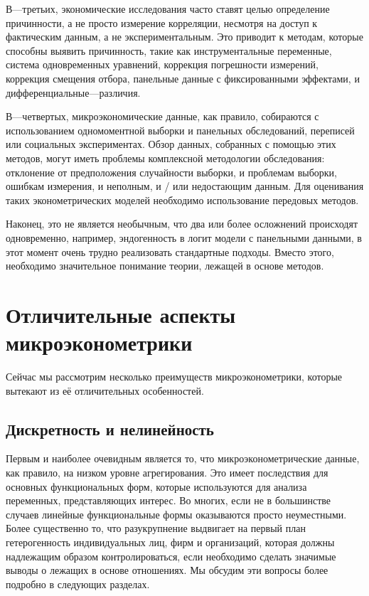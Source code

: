 	
	В---третьих, экономические исследования часто ставят целью определение причинности, а не просто измерение корреляции, несмотря на доступ к фактическим данным, а не экспериментальным. Это приводит к методам, которые способны выявить причинность, такие как инструментальные переменные, система одновременных уравнений, коррекция погрешности измерений, коррекция смещения отбора, панельные данные с фиксированными эффектами, и дифференциальные---различия.
	
	
	В---четвертых, микроэкономические данные, как правило, собираются с использованием одномоментной выборки и панельных обследований, переписей или социальных экспериментах. Обзор данных, собранных с помощью этих методов, могут иметь проблемы комплексной методологии обследования: отклонение от предположения случайности выборки, и проблемам выборки, ошибкам измерения, и неполным, и / или недостающим данным. Для оценивания таких эконометрических моделей необходимо использование передовых методов.
	
	
	Наконец, это не является необычным, что два или более осложнений происходят одновременно, например, эндогенность в логит модели с панельными данными, в этот момент очень трудно реализовать стандартные подходы. Вместо этого, необходимо значительное понимание теории, лежащей в основе методов.


\section{Отличительные аспекты микроэконометрики}

	Сейчас мы рассмотрим несколько преимуществ микроэконометрики, которые вытекают из её отличительных особенностей.

\subsection{Дискретность и нелинейность}

	Первым и наиболее очевидным является то, что микроэконометрические данные, как правило, на низком уровне агрегирования. Это имеет последствия для основных функциональных форм, которые используются для анализа переменных, представляющих интерес. Во многих, если не в большинстве случаев линейные функциональные формы оказываются просто неуместными. Более существенно то, что разукрупнение выдвигает на первый план гетерогенность индивидуальных лиц, фирм и организаций, которая должны надлежащим образом контролироваться, если необходимо сделать значимые выводы о лежащих в основе отношениях. Мы обсудим эти вопросы более подробно в следующих разделах.
	
